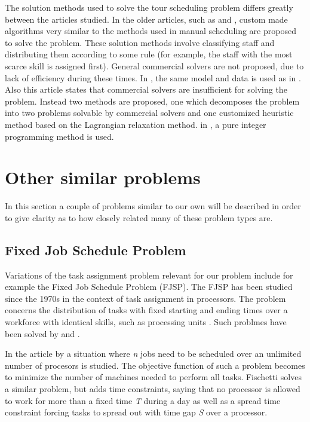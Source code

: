 The solution methods used to solve the tour scheduling problem differs greatly between the articles studied. In the older articles, such as \citet{thompson_1988} and \citet{loucks_1991}, custom made algorithms very similar to the methods used in manual scheduling are proposed to solve the problem. These solution methods involve classifying staff and distributing them according to some rule (for example, the staff with the most scarce skill is assigned first). General commercial solvers are not proposed, due to lack of efficiency during these times. In \citet{hojati_2011}, the same model and data is used as in \citet{loucks_1991}. Also this article states that commercial solvers are insufficient for solving the problem. Instead two methods are proposed, one which decomposes the problem into two problems solvable by commercial solvers and one customized heuristic method based on the Lagrangian relaxation method. in \citet{choi_hwang_park_2009}, a pure integer programming method is used.


\section{Other similar problems}\label{other}
In this section a couple of problems similar to our own will be described in order to give clarity as to how closely related many of these problem types are.
\subsection{Fixed Job Schedule Problem}
Variations of the task assignment problem relevant for our problem include for example the Fixed Job Schedule Problem (FJSP). The FJSP has been studied since the 1970s in the context of task assignment in processors. The problem concerns the distribution of tasks with fixed starting and ending times over a workforce with identical skills, such as processing units \citet{krishnamoorthy_2012}. Such problmes have been solved by \citet{gertsbakh_1977} and \citet{fischetti_1992}.

In the article by \citet{gertsbakh_1977} a situation where \textit{n} jobs need to be scheduled over an unlimited number of procesors is studied. The objective function of such a problem becomes to minimize the number of machines needed to perform all tasks. Fischetti solves a similar problem, but adds time constraints, saying that no processor is allowed to work for more than a fixed time \textit{T} during a day as well as a spread time constraint forcing tasks to spread out with time gap \textit{S} over a processor.

